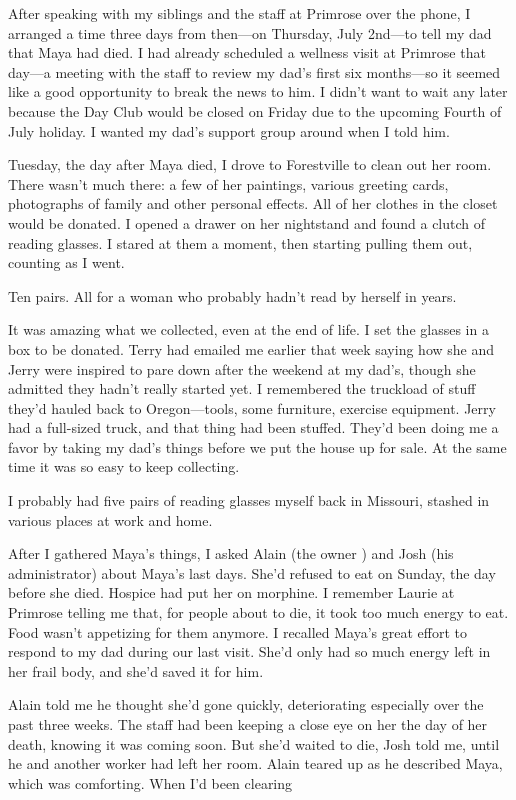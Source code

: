 \documentclass[12pt]{book}
\begin{document}
After speaking with my siblings and the staff at Primrose over the phone, I arranged a time three days from then---on Thursday, July 2nd---to tell my dad that Maya had died. I had already scheduled a wellness visit at Primrose that day---a meeting with the staff to review my dad's first six months---so it seemed like a good opportunity to break the news to him. I didn't want to wait any later because the Day Club would be closed on Friday due to the upcoming Fourth of July holiday. I wanted my dad's support group around when I told him.

Tuesday, the day after Maya died, I drove to Forestville to clean out her room. There wasn't much there: a few of her paintings, various greeting cards, photographs of family and other personal effects. All of her clothes in the closet would be donated. I opened a drawer on her nightstand and found a clutch of reading glasses. I stared at them a moment, then starting pulling them out, counting as I went.

Ten pairs. All for a woman who probably hadn't read by herself in years.

It was amazing what we collected, even at the end of life. I set the glasses in a box to be donated. Terry had emailed me earlier that week saying how she and Jerry were inspired to pare down after the weekend at my dad's, though she admitted they hadn't really started yet. I remembered the truckload of stuff they'd hauled back to Oregon---tools, some furniture, exercise equipment. Jerry had a full-sized truck, and that thing had been stuffed. They'd been doing me a favor by taking my dad's things before we put the house up for sale. At the same time it was so easy to keep collecting.

I probably had five pairs of reading glasses myself back in Missouri, stashed in various places at work and home.

After I gathered Maya's things, I asked Alain (the owner ) and Josh (his administrator) about Maya's last days. She'd refused to eat on Sunday, the day before she died. Hospice had put her on morphine. I remember Laurie at Primrose telling me that, for people about to die, it took too much energy to eat. Food wasn't appetizing for them anymore. I recalled Maya's great effort to respond to my dad during our last visit. She'd only had so much energy left in her frail body, and she'd saved it for him.

Alain told me he thought she'd gone quickly, deteriorating especially over the past three weeks. The staff had been keeping a close eye on her the day of her death, knowing it was coming soon. But she'd waited to die, Josh told me, until he and another worker had left her room. Alain teared up as he described Maya, which was comforting. When I'd been clearing
\end{document}
